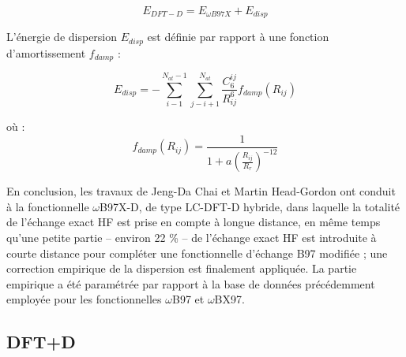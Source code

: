	\begin{equation}
	E_{DFT-D}=E_{\omega B97X}+E_{disp}
	\end{equation}
	
	L'énergie de dispersion $E_{disp}$ est définie par rapport à une fonction d'amortissement $f_{damp}$ :
	
	\begin{equation}
	E_{disp}=-\sum_{i-1}^{N_{at}-1} \sum_{j-i+1}^{N_{at}} \frac{C_{6}^{ij}}{R_{ij}^{6}}f_{damp} (R_{ij})
	\end{equation}
	
	\noindent où :
	\begin{equation}
	f_{damp} (R_{ij})=\frac{1}{1+a(\frac{R_{ij}}{R_{r}})^{-12}}
	\end{equation}
	
	En conclusion, les travaux de Jeng-Da Chai et Martin Head-Gordon ont conduit à la fonctionnelle $\omega$B97X-D, de type LC-DFT-D hybride, dans laquelle la totalité de l'échange exact HF est prise en compte à longue distance, en même temps qu'une petite partie -- environ 22 \% -- de l'échange exact HF est introduite à courte distance pour compléter une fonctionnelle d'échange B97 modifiée ; une correction empirique de la dispersion est finalement appliquée. La partie empirique a été paramétrée par rapport à la base de données précédemment employée pour les fonctionnelles $\omega$B97 et $\omega$BX97.
	
	\subsection{DFT+D}
	
